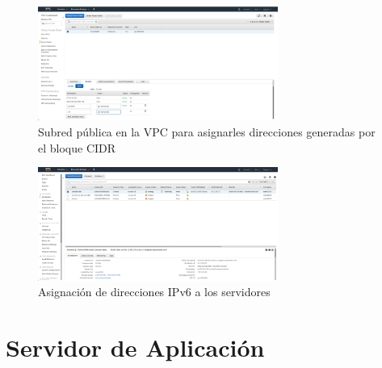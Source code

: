 \documentclass[9pt]{article}
\begin{document}
\begin{figure}[H]
  \centering
  \includegraphics[width=0.7\textwidth]{public_subnet}
  \caption{Subred pública en la VPC para asignarles direcciones generadas por el bloque CIDR}
\end{figure}

\begin{figure}[H]
  \centering
  \includegraphics[width=0.7\textwidth]{ipv6_assignment}
  \caption{Asignación de direcciones IPv6 a los servidores}
\end{figure}


\newpage

\section{Servidor de Aplicación}
\end{document}
